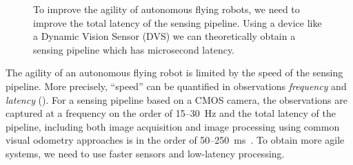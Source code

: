 \begin{figure}[b]
\begin{centering}
\par\end{centering}

\begin{centering}
\par\end{centering}

\caption{\label{fig:Discretization-and-latency}To improve the agility of autonomous
flying robots, we need to improve the total latency of the sensing
pipeline. Using a device like a Dynamic Vision Sensor (DVS) we can
theoretically obtain a sensing pipeline which has microsecond latency.}
\end{figure}


The agility of an autonomous flying robot is limited by the speed
of the sensing pipeline. More precisely, ``speed'' can be quantified
in observations\emph{ frequency} and \emph{latency} ().
For a sensing pipeline based on a CMOS camera, the observations are
captured at a frequency on the order of 15--30~Hz and the total latency
of the pipeline, including both image acquisition and image processing
using common visual odometry approaches is in the order of 50--250~ms~\cite{Weiss2011}.
To obtain more agile systems, we need to use faster sensors and low-latency
processing.

